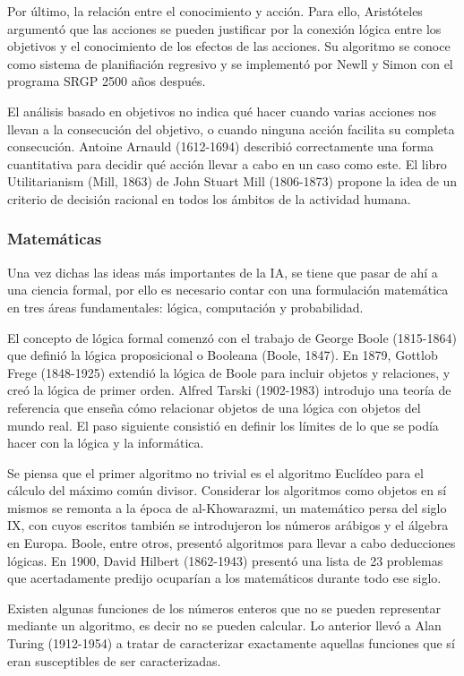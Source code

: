 \documentclass{article}
\begin{document}
Por último, la relación entre el conocimiento y acción. Para ello, Aristóteles argumentó que las acciones se pueden justificar por la conexión lógica entre los objetivos y el conocimiento de los efectos de las acciones. Su algoritmo se conoce como sistema de planifiación regresivo y se implementó por Newll y Simon con el programa SRGP 2500 años después. 

El análisis basado en objetivos no indica qué hacer cuando varias acciones nos llevan a la consecución del objetivo, o cuando ninguna acción facilita su completa consecución. Antoine Arnauld (1612-1694) describió correctamente una forma cuantitativa para decidir qué acción llevar a cabo en un caso como este. El libro Utilitarianism (Mill, 1863) de John Stuart Mill (1806-1873) propone la idea de un criterio de decisión racional en todos los ámbitos de la actividad humana.

\subsubsection{Matemáticas}

Una vez dichas las ideas más importantes de la IA, se tiene que pasar de ahí a una ciencia formal, por ello es necesario contar con una formulación matemática en tres áreas fundamentales: lógica, computación y probabilidad. 

El concepto de lógica formal comenzó con el trabajo de George Boole (1815-1864) que definió la lógica proposicional o Booleana (Boole, 1847). En 1879, Gottlob Frege (1848-1925) extendió la lógica de Boole para incluir objetos y relaciones, y creó la lógica de primer orden. Alfred Tarski (1902-1983) introdujo una teoría de referencia que enseña cómo relacionar objetos de una lógica con objetos del mundo real. El paso siguiente consistió en definir los límites de lo que se podía hacer con la lógica y la informática. 

Se piensa que el primer algoritmo no trivial es el algoritmo Euclídeo para el cálculo del máximo común divisor. Considerar los algoritmos como objetos en sí mismos se remonta a la época de al-Khowarazmi, un matemático persa del siglo IX, con cuyos escritos también se introdujeron los números arábigos y el álgebra en Europa. Boole, entre otros, presentó algoritmos para llevar a cabo deducciones lógicas. En 1900, David Hilbert (1862-1943) presentó una lista de 23 problemas que acertadamente predijo ocuparían a los matemáticos durante todo ese siglo. 

 Existen algunas funciones de los números enteros que no se pueden representar mediante un algoritmo, es decir no se pueden calcular. Lo anterior llevó a Alan Turing (1912-1954) a tratar de caracterizar exactamente aquellas funciones que sí eran susceptibles de ser caracterizadas.
 
\end{document}
